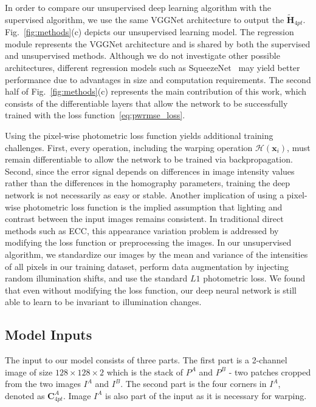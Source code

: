 \documentclass[letterpaper, 10 pt, conference]{ieeeconf}
\begin{document}
In order to compare our unsupervised deep learning algorithm with the supervised algorithm, we use the same VGGNet architecture to output the $\mathbf{\tilde{H}}_{4pt}$. Fig.~\ref{fig:methods}(c) depicts our unsupervised learning model. The regression module represents the VGGNet architecture and is shared by both the supervised and unsupervised methods. Although we do not investigate other possible architectures, different regression models such as SqueezeNet~\cite{iandola2016squeezenet} may yield better performance due to advantages in size and computation requirements. The second half of Fig.~\ref{fig:methods}(c) represents the main contribution of this work, which consists of the differentiable layers that allow the network to be successfully trained with the loss function~\eqref{eq:pwrmse_loss}.

Using the pixel-wise photometric loss function yields additional training challenges. First, every operation, including the warping operation $\mathcal{H}(\mathbf{x}_{i})$, must remain differentiable to allow the network to be trained via backpropagation. Second, since the error signal depends on differences in image intensity values rather than the differences in the homography parameters, training the deep network is not necessarily as easy or stable. Another implication of using a pixel-wise photometric loss function is the implied assumption that lighting and contrast between the input images remains consistent. In traditional direct methods such as ECC, this appearance variation problem is addressed by modifying the loss function or preprocessing the images. In our unsupervised algorithm, we standardize our images by the mean and variance of the intensities of all pixels in our training dataset, perform data augmentation by injecting random illumination shifts, and use the standard $L1$ photometric loss. We found that even without modifying the loss function, our deep neural network is still able to learn to be invariant to illumination changes.
\subsection{Model Inputs}
The input to our model consists of three parts. The first part is a 2-channel image of size $128 \times 128 \times 2$ which is the stack of $P^A$ and $P^B$ - two patches cropped from the two images $I^A$ and $I^B$. The second part is the four corners in $I^A$, denoted as $\mathbf{C}^A_{4pt}$. Image $I^A$ is also part of the input as it is necessary for warping.
 
\end{document}
